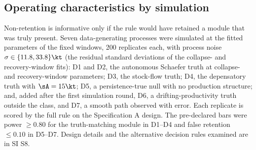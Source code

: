 \subsection{Operating characteristics by simulation}\label{sec:simdesign}

Non-retention is informative only if the rule would have retained a module that was truly present. Seven data-generating processes were simulated at the fitted parameters of the fixed windows, 200 replicates each, with process noise $\sigma \in \{11.8, 33.8\}\kt$ (the residual standard deviations of the collapse- and recovery-window fits): D1 and D2, the autonomous Schaefer truth at collapse- and recovery-window parameters; D3, the stock-flow truth; D4, the depensatory truth with $\sA = 15\kt$; D5, a persistence-true null with no production structure; and, added after the first simulation round, D6, a drifting-productivity truth outside the class, and D7, a smooth path observed with error. Each replicate is scored by the full rule on the Specification A design. The pre-declared bars were power $\ge 0.80$ for the truth-matching module in D1--D4 and false retention $\le 0.10$ in D5--D7. Design details and the alternative decision rules examined are in SI S8.
